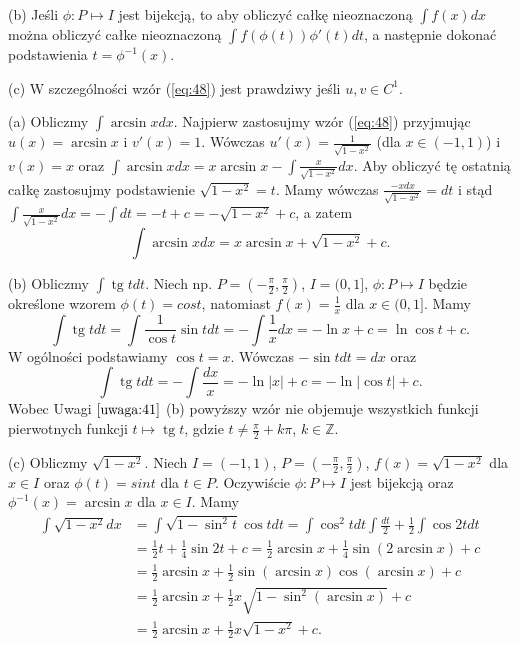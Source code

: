 \documentclass[leqno]{article}
\DeclareMathOperator{\tg}{\text{tg}}
\begin{document}
\begin{justify}
\begin{uwaga}
    \noindent
    (b) Jeśli $\phi : P \mapsto I$ jest bijekcją, to aby obliczyć całkę nieoznaczoną $\int f(x)dx$ można obliczyć całke nieoznaczoną
    $\int f(\phi(t))\phi'(t)dt$, a następnie dokonać podstawienia $t = \phi^{-1}(x)$.

    \noindent
    (c) W szczególności wzór (\ref{eq:48}) jest prawdziwy jeśli $u,v \in C^1$.
\end{uwaga}

\begin{ex}
    (a) Obliczmy $\int \arcsin x dx$. Najpierw zastosujmy wzór (\ref{eq:48}) przyjmując $u(x) = \arcsin x$ i $v'(x) = 1$.
    Wówczas $u'(x) = \frac{1}{\sqrt{1 - x^2}}$ (dla $x \in (-1, 1)$) i $v(x) = x$ oraz
    $\int \arcsin x dx = x \arcsin x - \int \frac{x}{\sqrt{1 - x^2}}dx$. Aby
    obliczyć tę ostatnią całkę zastosujmy podstawienie $\sqrt{1 - x^2} = t$. Mamy wówczas
    $\frac{-xdx}{\sqrt{1-x^2}}=dt$ i stąd $\int \frac{x}{\sqrt{1 - x^2}}dx = -\int dt = -t + c = -\sqrt{1 - x^2} + c$, a zatem
    \[
        \int \arcsin x dx = x \arcsin x + \sqrt{1 - x^2} + c.
    \]

    \noindent
    (b) Obliczmy $\int \tg t dt$. Niech np. $P = (-\frac{\pi}{2}, \frac{\pi}{2})$, $I = (0,1]$, $\phi : P \mapsto I$
    będzie określone wzorem $\phi(t) = cost$, natomiast $f(x) = \frac{1}{x}$ dla $x \in (0, 1]$. Mamy
    \[
        \int \tg t dt = \int \frac{1}{\cos t}\sin t dt = -\int \frac{1}{x}dx = -\ln x + c = \ln \cos t + c.
    \]
    W ogólności podstawiamy $\cos t = x$. Wówczas $-\sin t dt = dx$ oraz
    \[
        \int \tg t dt = -\int \frac{dx}{x} = -\ln |x| + c = -\ln |\cos t| + c.
    \]
    Wobec Uwagi $\ref{uwaga:41}$ (b) powyższy wzór nie objemuje wszystkich funkcji pierwotnych funkcji
    $t \mapsto \tg t$, gdzie $t \neq \frac{\pi}{2} + k\pi$, $k \in \mathbb{Z}$.

    \noindent
    (c) Obliczmy $\sqrt{1 - x^2}$. Niech $I = (-1, 1)$, $P = (-\frac{\pi}{2}, \frac{\pi}{2})$,
    $f(x) = \sqrt{1 - x^2}$ dla $x \in I$ oraz $\phi(t) = sint$ dla $t \in P$. Oczywiście $\phi : P \mapsto I$
    jest bijekcją oraz $\phi^{-1}(x) = \arcsin{x}$ dla $x \in I$. Mamy
    \begin{equation*}
        \begin{split}
            \int \sqrt{1-x^2}dx &= \int \sqrt{1-\sin^2{t}}\cos tdt  = \int \cos^{2}{t}dt
            \int \frac{dt}{2} + \frac{1}{2}\int \cos{2t}dt \\
            &= \frac{1}{2}t + \frac{1}{4}\sin{2t} + c = \frac{1}{2}\arcsin{x} + \frac{1}{4}\sin(2\arcsin{x}) + c \\
            &= \frac{1}{2}\arcsin x + \frac{1}{2} \sin(\arcsin x)\cos( \arcsin x) + c \\
            &= \frac{1}{2}\arcsin{x} + \frac{1}{2}x\sqrt{1 - \sin^{2} (\arcsin x)} + c \\
            &= \frac{1}{2}\arcsin{x} + \frac{1}{2}x\sqrt{1 - x^2} + c.
        \end{split}
    \end{equation*}
  

\end{ex}
\end{justify}
\end{document}
